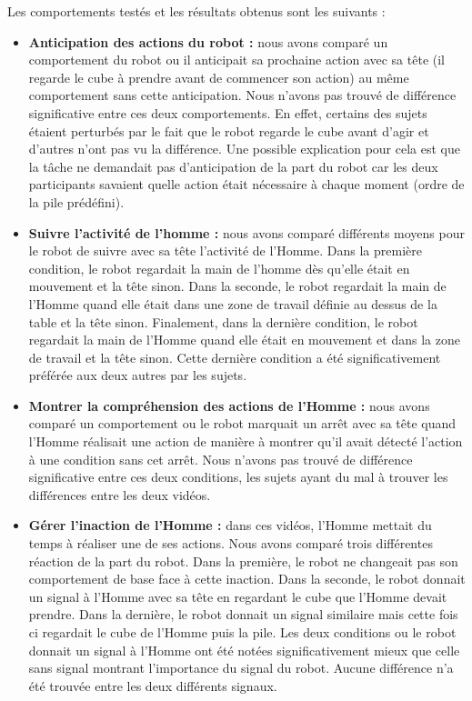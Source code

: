 \documentclass[english,a4paper,11pt,twoside]{StyleThese}
\begin{document}
Les comportements testés et les résultats obtenus sont les suivants :
\begin{itemize}
\item \textbf{Anticipation des actions du robot :} nous avons comparé un comportement du robot ou il anticipait sa prochaine action avec sa tête (il regarde le cube à prendre avant de commencer son action) au même comportement sans cette anticipation. Nous n'avons pas trouvé de différence significative entre ces deux comportements. En effet, certains des sujets étaient perturbés par le fait que le robot regarde le cube avant d'agir et d'autres n'ont pas vu la différence. Une possible explication pour cela est que la tâche ne demandait pas d'anticipation de la part du robot car les deux participants savaient quelle action était nécessaire à chaque moment (ordre de la pile prédéfini).
\item \textbf{Suivre l'activité de l'homme :} nous avons comparé différents moyens pour le robot de suivre avec sa tête l'activité de l'Homme. Dans la première condition, le robot regardait la main de l'homme dès qu'elle était en mouvement et la tête sinon. Dans la seconde, le robot regardait la main de l'Homme quand elle était dans une zone de travail définie au dessus de la table et la tête sinon. Finalement, dans la dernière condition, le robot regardait la main de l'Homme quand elle était en mouvement et dans la zone de travail et la tête sinon. Cette dernière condition a été significativement préférée aux deux autres par les sujets.
\item \textbf{Montrer la compréhension des actions de l'Homme :} nous avons comparé un comportement ou le robot marquait un arrêt avec sa tête quand l'Homme réalisait une action de manière à montrer qu'il avait détecté l'action à une condition sans cet arrêt. Nous n'avons pas trouvé de différence significative entre ces deux conditions, les sujets ayant du mal à trouver les différences entre les deux vidéos.
\item \textbf{Gérer l'inaction de l'Homme :} dans ces vidéos, l'Homme mettait du temps à réaliser une de ses actions. Nous avons comparé trois différentes réaction de la part du robot. Dans la première, le robot ne changeait pas son comportement de base face à cette inaction. Dans la seconde, le robot donnait un signal à l'Homme avec sa tête en regardant le cube que l'Homme devait prendre. Dans la dernière, le robot donnait un signal similaire mais cette fois ci regardait le cube de l'Homme puis la pile. Les deux conditions ou le robot donnait un signal à l'Homme ont été notées significativement mieux que celle sans signal montrant l'importance du signal du robot. Aucune différence n'a été trouvée entre les deux différents signaux.

\end{itemize}
\end{document}
